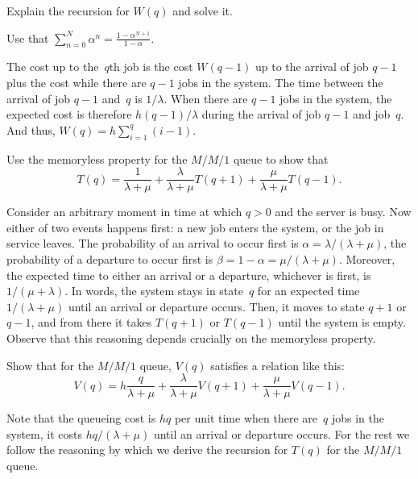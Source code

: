 \documentclass[stochastic-or.tex]{subfiles}
\begin{document}
\begin{exercise}\label{ex:nmm-4}
Explain the  recursion for $W(q)$ and solve it.
\begin{hint}
Use that $\sum_{n=0}^N \alpha^n = \frac{1-\alpha^{N+1}}{1-\alpha}$.
\end{hint}
\begin{solution}
The cost up to the~$q$th job is the cost $W(q-1)$ up to the arrival of job $q-1$ plus the cost while there are $q-1$ jobs in the system.
The time between the arrival of job $q-1$ and~$q$ is $1/\lambda$.
When there are $q-1$ jobs in the system, the expected cost is therefore $h(q-1)/\lambda$ during the arrival of job $q-1$ and job~$q$.
And thus, $W(q) = h\sum_{i=1}^q (i-1)$.
\end{solution}
\end{exercise}


\begin{exercise}
Use the memoryless property for the $M/M/1$ queue to show that
\begin{equation}  \label{eq:92}
  T(q) =  \frac{1}{\lambda+\mu} + \frac{\lambda}{\lambda+\mu} T(q+1) + \frac{\mu}{\lambda+\mu} T(q-1).
\end{equation}
\begin{solution}
Consider an arbitrary moment in time at which $q>0$ and the server is busy.
Now either of two events happens first: a new job enters the system, or the job in service leaves.
The probability of an arrival to occur first is $\alpha=\lambda/(\lambda+\mu)$, the probability of a departure to occur first is $\beta=1-\alpha = \mu/(\lambda+\mu)$.
Moreover, the expected time to either an arrival or a departure, whichever is first, is $1/(\mu+\lambda)$.
In words, the system stays in state~$q$ for an expected time $1/(\lambda+\mu)$ until an arrival or departure occurs.
Then, it moves to state $q+1$ or $q-1$, and from there it takes $T(q+1)$ or $T(q-1)$ until the system is empty.
Observe that this reasoning depends crucially on the memoryless property.
\end{solution}
\end{exercise}

\begin{exercise}
Show that for the $M/M/1$ queue, $V(q)$ satisfies a relation like this:
\begin{equation}\label{eq:93}
  V(q) = h\frac{q}{\lambda + \mu} + \frac{\lambda}{\lambda+\mu} V(q+1) + \frac{\mu}{\lambda+\mu} V(q-1).
\end{equation}
\begin{solution}
Note that the queueing cost is $hq$ per unit time when there are~$q$ jobs in the system, it costs $hq/(\lambda+\mu)$ until an arrival or departure occurs. For the rest we follow the reasoning by which we derive the recursion for $T(q)$ for the $M/M/1$ queue.
\end{solution}
\end{exercise}
\end{document}
